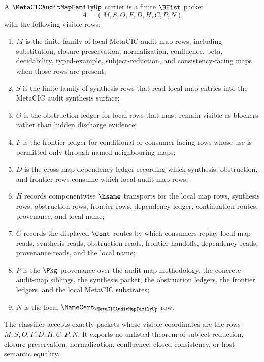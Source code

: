 \begin{definition}
\label{def:metacic-audit-map-family-carrier}
A $\MetaCICAuditMapFamilyUp$ carrier is a finite $\BHist$ packet
$$
A=(M,S,O,F,D,H,C,P,N)
$$
with the following visible rows:
\begin{enumerate}
\item $M$ is the finite family of local MetaCIC audit-map rows, including substitution, closure-preservation, normalization, confluence, beta, decidability, typed-example, subject-reduction, and consistency-facing maps when those rows are present;
\item $S$ is the finite family of synthesis rows that read local map entries into the MetaCIC audit synthesis surface;
\item $O$ is the obstruction ledger for local rows that must remain visible as blockers rather than hidden discharge evidence;
\item $F$ is the frontier ledger for conditional or consumer-facing rows whose use is permitted only through named neighbouring maps;
\item $D$ is the cross-map dependency ledger recording which synthesis, obstruction, and frontier rows consume which local audit-map rows;
\item $H$ records componentwise $\hsame$ transports for the local map rows, synthesis rows, obstruction rows, frontier rows, dependency ledger, continuation routes, provenance, and local name;
\item $C$ records the displayed $\Cont$ routes by which consumers replay local-map reads, synthesis reads, obstruction reads, frontier handoffs, dependency reads, provenance reads, and the local name;
\item $P$ is the $\Pkg$ provenance over the audit-map methodology, the concrete audit-map siblings, the synthesis packet, the obstruction ledgers, the frontier ledgers, and the local MetaCIC substrates;
\item $N$ is the local $\NameCert_{\MetaCICAuditMapFamilyUp}$ row.
\end{enumerate}
The classifier accepts exactly packets whose visible coordinates are the rows $M,S,O,F,D,H,C,P,N$. It exports no unlisted theorem of subject reduction, closure preservation, normalization, confluence, closed consistency, or host semantic equality.
\end{definition}

